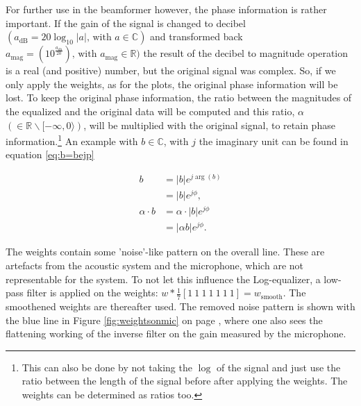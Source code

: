 For further use in the beamformer however, the phase information is rather important.
If the gain of the signal is changed to decibel $(a_\text{dB}=20\log_{10}|a|\text{, with }a\in\mathbb{C})$ and transformed back $a_\text{mag}=\left(10^\frac{a_\text{db}}{20}\right)\text{, with }a_\text{mag}\in\mathbb{R})$ the result of the decibel to magnitude operation is a real (and positive) number, but the original signal was complex.
So, if we only apply the weights, as for the plots, the original phase information will be lost.
To keep the original phase information, the ratio between the magnitudes of the equalized and the original data will be computed and this ratio, $\alpha$ $(\in\mathbb{R}\backslash [-\infty,0\rangle)$, will be multiplied with the original signal, to retain phase information.\footnote{This can also be done by not taking the $\log$ of the signal and just use the ratio between the length of the signal before after applying the weights. The weights can be determined as ratios too.}
An example with $b\in\mathbb{C}$, with $j$ the imaginary unit can be found in equation \eqref{eq:b=bejp}

\begin{equation}
\label{eq:b=bejp}
\begin{split}
b&=|b|e^{j\arg(b)}\\
&=|b|e^{j\phi},\\
\alpha\cdot b&=\alpha \cdot |b|e^{j\phi}\\
&=|\alpha b|e^{j\phi}.
\end{split}
\end{equation}

The weights contain some 'noise'-like pattern on the overall line.
These are artefacts from the acoustic system and the microphone, which are not representable for the system.
To not let this influence the Log-equalizer, a low-pass filter is applied on the weights: $w*\frac{1}{7}\left[1~1~1~1~1~1~1\right]=w_\text{smooth}$.
The smoothened weights are thereafter used.
The removed noise pattern is shown with the blue line in Figure \ref{fig:weightsonmic} on page \pageref{fig:weightsonmic}, where one also sees the flattening working of the inverse filter on the gain measured by the microphone.


